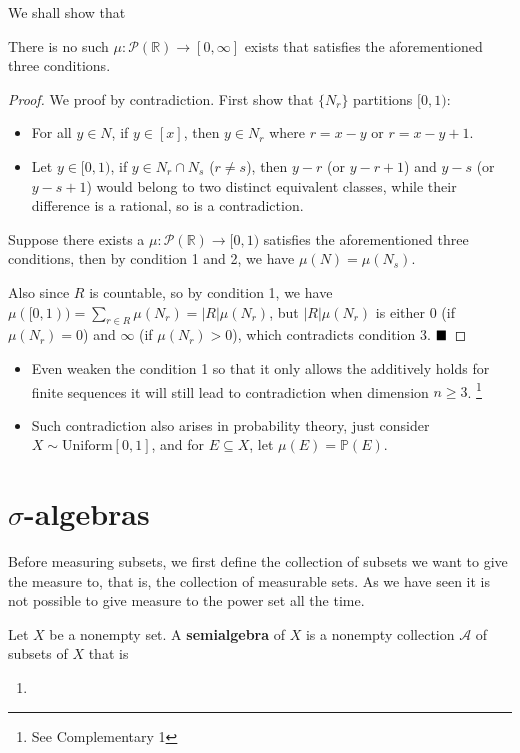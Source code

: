 We shall show that
\begin{corollary}
 \normalfont There is no such $\mu: \mathcal{P}(\mathbb{R}) \to [0,\infty]$ exists that satisfies the aforementioned three conditions.
\end{corollary}
\begin{proof}
    We proof by contradiction. First show that $\{ N_r \}$ partitions $[0,1)$:
    \begin{itemize}
        \item For all $y \in N$, if $y \in [x]$, then $y \in N_r$ where $r=x-y$ or $r=x-y+1$.
        \item Let $y \in [0,1)$, if $y \in N_r \cap N_s$ ($r \neq  s$), then $y - r $ (or $y - r + 1$) and $y - s $ (or $y - s + 1$) would belong to two distinct equivalent classes, while their difference is a rational, so is a contradiction.
    \end{itemize}
    
    Suppose there exists a $\mu: \mathcal{P}(\mathbb{R}) \to [0,1)$ satisfies the aforementioned three conditions, then by condition 1 and 2, we have $\mu(N) = \mu(N_s)$.
    
    Also since $R$ is countable, so by condition 1, we have $\mu([0,1)) = \sum\limits_{r \in R} \mu(N_r) = |R| \mu(N_r) $, but $|R| \mu(N_r)$ is either 0 (if $\mu(N_r) = 0$) and $\infty$ (if $\mu(N_r) > 0$), which contradicts condition 3. $\qed$
\end{proof}

\begin{remark}
\begin{itemize}
    \item Even weaken the condition 1 so that it only allows the additively holds for finite sequences it will still lead to contradiction when dimension $n\ge 3$. \footnote{See Complementary 1}
    \item Such contradiction also arises in probability theory, just consider $X \sim \text{Uniform}[0,1]$, and for $E \subseteq X$, let $\mu(E) = \mathbb{P}(E)$.
\end{itemize}
\end{remark}

\section{$\sigma$-algebras} \label{sec:}
\begin{motivation}
    Before measuring subsets, we first define the collection of subsets we want to give the measure to, that is, the collection of measurable sets. As we have seen it is not possible to give measure to the power set all the time.
\end{motivation}
\begin{definition}[Semialgebras]
    \normalfont Let $X$ be a nonempty set. A \textbf{semialgebra} of $X$ is a nonempty collection $\mathcal{A}$ of subsets of $X$ that is
    \begin{enumerate}
        \item 
    \end{enumerate}
\end{definition}

